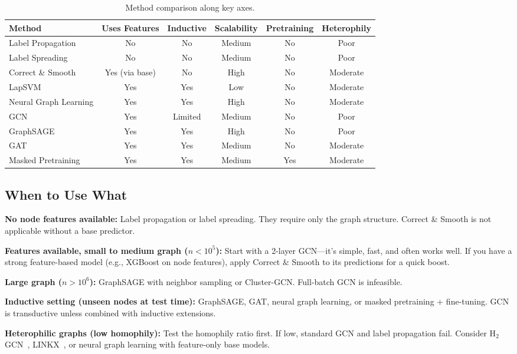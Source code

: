 \begin{notechapter}
\begin{table}[ht]
\centering\small
\begin{tabular}{lccccc}
\toprule
\textbf{Method} & \textbf{Uses Features} & \textbf{Inductive} &
\textbf{Scalability} & \textbf{Pretraining} & \textbf{Heterophily} \\ \midrule
Label Propagation & No & No & Medium & No & Poor \\
Label Spreading & No & No & Medium & No & Poor \\
Correct \& Smooth & Yes (via base) & No & High & No & Moderate \\
LapSVM & Yes & Yes & Low & No & Moderate \\
Neural Graph Learning & Yes & Yes & High & No & Moderate \\
GCN & Yes & Limited & Medium & No & Poor \\
GraphSAGE & Yes & Yes & High & No & Poor \\
GAT & Yes & Yes & Medium & No & Moderate \\
Masked Pretraining & Yes & Yes & Medium & Yes & Moderate \\
\bottomrule
\end{tabular}
\caption{Method comparison along key axes.}
\label{semi-supervised-graphs:tab:comparison}
\end{table}

\subsection{When to Use What}

\textbf{No node features available:}
Label propagation or label spreading. They require only the graph structure.
Correct \& Smooth is not applicable without a base predictor.

\textbf{Features available, small to medium graph ($n < 10^5$):}
Start with a 2-layer GCN---it's simple, fast, and often works well.
If you have a strong feature-based model (e.g., XGBoost on node features),
apply Correct \& Smooth to its predictions for a quick boost.

\textbf{Large graph ($n > 10^6$):}
GraphSAGE with neighbor sampling or Cluster-GCN. Full-batch GCN is infeasible.

\textbf{Inductive setting (unseen nodes at test time):}
GraphSAGE, GAT, neural graph learning, or masked pretraining + fine-tuning.
GCN is transductive unless combined with inductive extensions.

\textbf{Heterophilic graphs (low homophily):}
Test the homophily ratio first. If low, standard GCN and label propagation fail.
Consider H$_2$GCN~\cite{semi-supervised-graphs:zhu2020beyond}, LINKX~\cite{semi-supervised-graphs:lim2021large}, or
neural graph learning with feature-only base models.


\end{notechapter}
